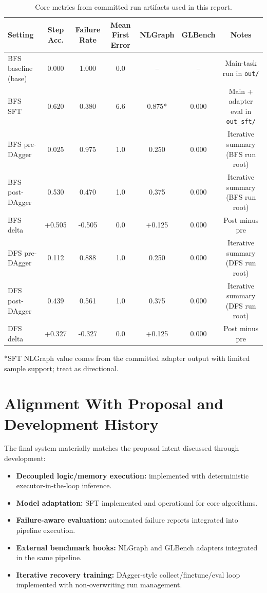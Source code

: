 \documentclass[sigplan,screen]{acmart}
\begin{document}
\begin{table}[t]
  \centering
  \caption{Core metrics from committed run artifacts used in this report.}
  \label{tab:core}
  \begin{tabular}{lcccccc}
    \toprule
    Setting & Step Acc. & Failure Rate & Mean First Error & NLGraph & GLBench & Notes \\
    \midrule
    BFS baseline (base) & 0.000 & 1.000 & 0.0 & -- & -- & Main-task run in \texttt{out/} \\
    BFS SFT & 0.620 & 0.380 & 6.6 & 0.875* & 0.000 & Main + adapter eval in \texttt{out\_sft/} \\
    \midrule
    BFS pre-DAgger & 0.025 & 0.975 & 1.0 & 0.250 & 0.000 & Iterative summary (BFS run root) \\
    BFS post-DAgger & 0.530 & 0.470 & 1.0 & 0.375 & 0.000 & Iterative summary (BFS run root) \\
    BFS delta & +0.505 & -0.505 & 0.0 & +0.125 & 0.000 & Post minus pre \\
    \midrule
    DFS pre-DAgger & 0.112 & 0.888 & 1.0 & 0.250 & 0.000 & Iterative summary (DFS run root) \\
    DFS post-DAgger & 0.439 & 0.561 & 1.0 & 0.375 & 0.000 & Iterative summary (DFS run root) \\
    DFS delta & +0.327 & -0.327 & 0.0 & +0.125 & 0.000 & Post minus pre \\
    \bottomrule
  \end{tabular}
  \vspace{2pt}
  \footnotesize{*SFT NLGraph value comes from the committed adapter output with limited sample support; treat as directional.}
\end{table}

\section{Alignment With Proposal and Development History}
The final system materially matches the proposal intent discussed through development:
\begin{itemize}
  \item \textbf{Decoupled logic/memory execution:} implemented with deterministic executor-in-the-loop inference.
  \item \textbf{Model adaptation:} SFT implemented and operational for core algorithms.
  \item \textbf{Failure-aware evaluation:} automated failure reports integrated into pipeline execution.
  \item \textbf{External benchmark hooks:} NLGraph and GLBench adapters integrated in the same pipeline.
  \item \textbf{Iterative recovery training:} DAgger-style collect/finetune/eval loop implemented with non-overwriting run management.
\end{itemize}
\end{document}
